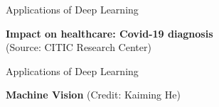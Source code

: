 \begin{frame}  {Applications of Deep Learning}
  \begin{figure}
    \centering

  \end{figure}
  \hspace{1cm} \textbf{Impact on healthcare: Covid-19 diagnosis}\\ \hspace{1cm}(Source: CITIC Research Center)
\end{frame}

\begin{frame} {Applications of Deep Learning}
  \begin{figure}
    \centering
  \end{figure}
   \hspace{3cm}     \textbf{Machine Vision} (Credit: Kaiming He)
\end{frame}

